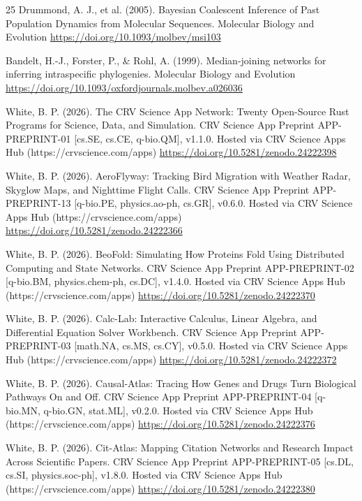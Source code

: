 \documentclass[10pt,letterpaper]{article}
\begin{document}
\begin{thebibliography}{25}
 Drummond, A. J., et al. (2005). Bayesian Coalescent Inference of Past Population Dynamics from Molecular Sequences. Molecular Biology and Evolution \url{https://doi.org/10.1093/molbev/msi103}

 Bandelt, H.-J., Forster, P., \& Rohl, A. (1999). Median-joining networks for inferring intraspecific phylogenies. Molecular Biology and Evolution \url{https://doi.org/10.1093/oxfordjournals.molbev.a026036}

 White, B. P. (2026). The CRV Science App Network: Twenty Open-Source Rust Programs for Science, Data, and Simulation. CRV Science App Preprint APP-PREPRINT-01 [cs.SE, cs.CE, q-bio.QM], v1.1.0. Hosted via CRV Science Apps Hub (https://crvscience.com/apps) \url{https://doi.org/10.5281/zenodo.24222398}

 White, B. P. (2026). AeroFlyway: Tracking Bird Migration with Weather Radar, Skyglow Maps, and Nighttime Flight Calls. CRV Science App Preprint APP-PREPRINT-13 [q-bio.PE, physics.ao-ph, cs.GR], v0.6.0. Hosted via CRV Science Apps Hub (https://crvscience.com/apps) \url{https://doi.org/10.5281/zenodo.24222366}

 White, B. P. (2026). BeoFold: Simulating How Proteins Fold Using Distributed Computing and State Networks. CRV Science App Preprint APP-PREPRINT-02 [q-bio.BM, physics.chem-ph, cs.DC], v1.4.0. Hosted via CRV Science Apps Hub (https://crvscience.com/apps) \url{https://doi.org/10.5281/zenodo.24222370}

 White, B. P. (2026). Calc-Lab: Interactive Calculus, Linear Algebra, and Differential Equation Solver Workbench. CRV Science App Preprint APP-PREPRINT-03 [math.NA, cs.MS, cs.CY], v0.5.0. Hosted via CRV Science Apps Hub (https://crvscience.com/apps) \url{https://doi.org/10.5281/zenodo.24222372}

 White, B. P. (2026). Causal-Atlas: Tracing How Genes and Drugs Turn Biological Pathways On and Off. CRV Science App Preprint APP-PREPRINT-04 [q-bio.MN, q-bio.GN, stat.ML], v0.2.0. Hosted via CRV Science Apps Hub (https://crvscience.com/apps) \url{https://doi.org/10.5281/zenodo.24222376}

 White, B. P. (2026). Cit-Atlas: Mapping Citation Networks and Research Impact Across Scientific Papers. CRV Science App Preprint APP-PREPRINT-05 [cs.DL, cs.SI, physics.soc-ph], v1.8.0. Hosted via CRV Science Apps Hub (https://crvscience.com/apps) \url{https://doi.org/10.5281/zenodo.24222380}


\end{thebibliography}
\end{document}
